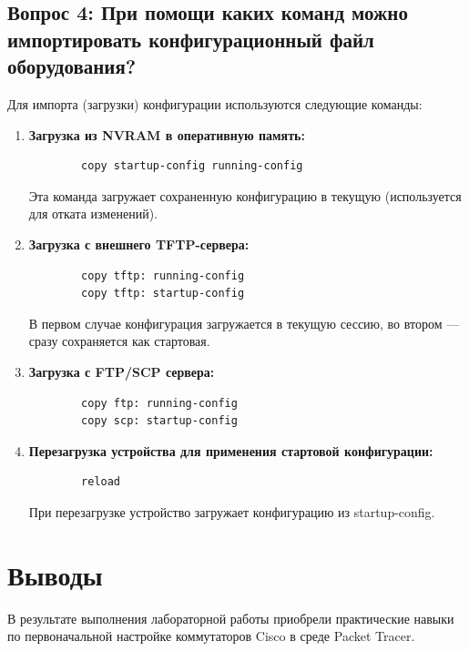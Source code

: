 \subsection{Вопрос 4: При помощи каких команд можно импортировать конфигурационный файл оборудования?}
Для импорта (загрузки) конфигурации используются следующие команды:

\begin{enumerate}
    \item \textbf{Загрузка из NVRAM в оперативную память:}
    \begin{verbatim}
        copy startup-config running-config
    \end{verbatim}
    Эта команда загружает сохраненную конфигурацию в текущую (используется для отката изменений).
    
    \item \textbf{Загрузка с внешнего TFTP-сервера:}
    \begin{verbatim}
        copy tftp: running-config
        copy tftp: startup-config
    \end{verbatim}
    В первом случае конфигурация загружается в текущую сессию, во втором — сразу сохраняется как стартовая.
    
    \item \textbf{Загрузка с FTP/SCP сервера:}
    \begin{verbatim}
        copy ftp: running-config
        copy scp: startup-config
    \end{verbatim}
    
    \item \textbf{Перезагрузка устройства для применения стартовой конфигурации:}
    \begin{verbatim}
        reload
    \end{verbatim}
    При перезагрузке устройство загружает конфигурацию из startup-config.
\end{enumerate}

\section{Выводы}
В результате выполнения лабораторной работы приобрели практические навыки по первоначальной настройке коммутаторов Cisco в среде Packet Tracer.


